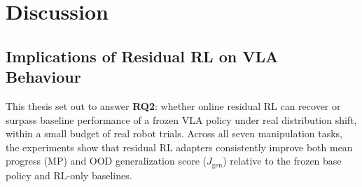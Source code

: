 




\chapter{Discussion}
\label{sec:discussion}

\section{Implications of Residual RL on VLA Behaviour}

This thesis set out to answer \textbf{RQ2}: whether online residual RL can recover or surpass baseline performance of a frozen VLA policy under real distribution shift, within a small budget of real robot trials. Across all seven manipulation tasks, the experiments show that residual RL adapters consistently improve both mean progress (MP) and OOD generalization score ($J_{\text{gen}}$) relative to the frozen base policy and RL-only baselines.


